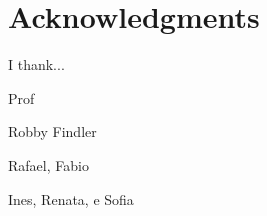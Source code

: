 
\chapter*{Acknowledgments}
\thispagestyle{empty}
I thank...


Prof

Robby Findler

Rafael, Fabio

Ines, Renata, e Sofia